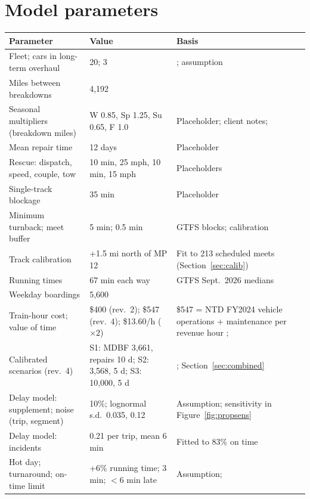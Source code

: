 \documentclass[11pt]{article}
\begin{document}
\appendix
\section{Model parameters}
\begin{table}[ht]\centering\small
\begin{tabularx}{\textwidth}{@{}p{4.6cm}p{3.2cm}L@{}}
\toprule
Parameter & Value & Basis \\
\midrule
Fleet; cars in long-term overhaul & 20; 3 & \citet{wiki_riverline}; assumption \\
Miles between breakdowns & 4{,}192 & \citet{roinj2025riverline} \\
Seasonal multipliers (breakdown miles) & W 0.85, Sp 1.25, Su 0.65, F 1.0 & Placeholder; client notes; \citet{ferranti2016heat} \\
Mean repair time & 12 days & Placeholder \\
Rescue: dispatch, speed, couple, tow & 10 min, 25 mph, 10 min, 15 mph & Placeholders \\
Single-track blockage & 35 min & Placeholder \\
Minimum turnback; meet buffer & 5 min; 0.5 min & GTFS blocks; calibration \\
Track calibration & +1.5 mi north of MP 12 & Fit to 213 scheduled meets (Section~\ref{sec:calib}) \\
Running times & 67 min each way & GTFS Sept.~2026 medians \citep{njt2026gtfs} \\
Weekday boardings & 5{,}600 & \citet{wiki_riverline} \\
Train-hour cost; value of time & \$400 (rev.~2); \$547 (rev.~4); \$13.60/h ($\times 2$) & \$547 = NTD FY2024 vehicle operations + maintenance per revenue hour \citep{ntd_ts21}; \citet{usdot2016vtts} \\
Calibrated scenarios (rev.~4) & S1: MDBF 3{,}661, repairs 10 d; S2: 3{,}568, 5 d; S3: 10{,}000, 5 d & \citet{njt_mdbf}; Section~\ref{sec:combined} \\
Delay model: supplement; noise (trip, segment) & 10\%; lognormal s.d.\ 0.035, 0.12 & Assumption; sensitivity in Figure~\ref{fig:propsens} \\
Delay model: incidents & 0.21 per trip, mean 6 min & Fitted to 83\% on time \citep{roinj2025riverline} \\
Hot day; turnaround; on-time limit & +6\% running time; 3 min; $<$6 min late & Assumption; \citet{njt2019otp} \\
\bottomrule
\end{tabularx}
\end{table}
\end{document}
